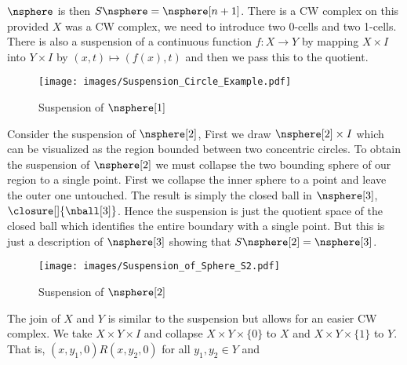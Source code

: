 \documentclass{book}                                                           %
\begin{document}
                $\nsphere$ is then $S\nsphere=\nsphere[n+1]$. There is a CW
                complex on this provided $X$ was a CW complex, we need to
                introduce two 0-cells and two 1-cells. There is also a
                suspension of a continuous function $f:X\rightarrow{Y}$ by
                mapping $X\times{I}$ into $Y\times{I}$ by
                $(x,t)\mapsto(f(x),t)$ and then we pass this to the quotient.
                \begin{figure}[H]
                    \centering
                    \captionsetup{type=figure}
                    \texttt{[image: images/Suspension\_Circle\_Example.pdf]}
                    \caption{Suspension of $\nsphere[1]$}
                    \label{fig:Suspension_of_Circle}
                \end{figure}
                \begin{example}
                    Consider the suspension of $\nsphere[2]$, First we draw
                    $\nsphere[2]\times{I}$ which can be visualized as the region
                    bounded between two concentric circles. To obtain the
                    suspension of $\nsphere[2]$ we must collapse the two
                    bounding sphere of our region to a single point. First we
                    collapse the inner sphere to a point and leave the outer one
                    untouched. The result is simply the closed ball in
                    $\nsphere[3]$, $\closure[]{\nball[3]}$. Hence the suspension
                    is just the quotient space of the closed ball which
                    identifies the entire boundary with a single point. But this
                    is just a description of $\nsphere[3]$ showing that
                    $S\nsphere[2]=\nsphere[3]$.
                \end{example}
                \begin{figure}[H]
                    \centering
                    \captionsetup{type=figure}
                    \texttt{[image: images/Suspension\_of\_Sphere\_S2.pdf]}
                    \caption{Suspension of $\nsphere[2]$}
                    \label{fig:Suspension_of_Sphere}
                \end{figure}
                The join of $X$ and $Y$ is similar to the suspension but allows
                for an easier CW complex. We take $X\times{Y}\times{I}$ and
                collapse $X\times{Y}\times\{0\}$ to $X$ and
                $X\times{Y}\times\{1\}$ to $Y$. That is,
                $(x,y_{1},0)R(x,y_{2},0)$ for all $y_{1},y_{2}\in{Y}$ and
\end{document}
